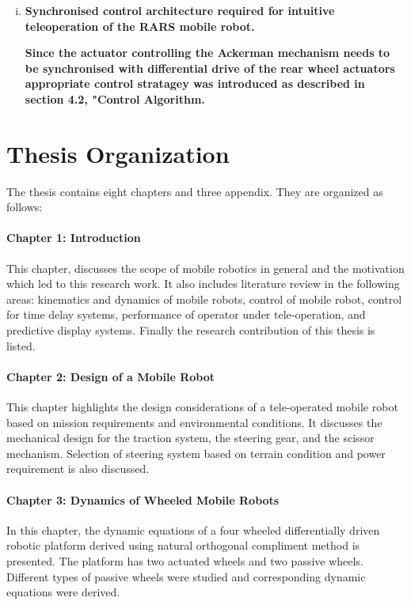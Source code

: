 \begin{enumerate}[(i)]
%	
	   
\item \textbf{Synchronised control architecture required for intuitive teleoperation of the RARS mobile robot.} 

\textbf{Since the actuator controlling the Ackerman mechanism needs to be synchronised with differential drive of the rear wheel actuators appropriate control stratagey was introduced as described in section 4.2, "Control Algorithm.}



\end{enumerate}
\section{Thesis Organization}
The thesis contains eight chapters and three appendix. They are organized as follows:
\paragraph*{Chapter 1: Introduction\\}
This  chapter, discusses the scope of mobile robotics in general and the motivation which led to this research work. It also includes literature review in the following areas: kinematics and dynamics of mobile robots, control of mobile robot, control for time delay systems, performance of operator under tele-operation,  and predictive display systems. Finally the research contribution of this thesis is listed. 


\paragraph*{Chapter 2: Design of a Mobile Robot\\}
This chapter highlights the design considerations of a tele-operated mobile robot based on mission requirements and  environmental conditions.  It  discusses the mechanical design for the traction system, the steering gear, and the scissor mechanism. Selection of  steering system based on terrain condition and power requirement is also discussed.   
\paragraph*{Chapter 3: Dynamics of Wheeled Mobile Robots \\}
In this chapter, the dynamic equations of a four wheeled differentially driven robotic platform derived using natural orthogonal compliment method is presented. The platform has two actuated wheels and two passive wheels. Different types of passive wheels were studied and  corresponding dynamic equations were derived. 
